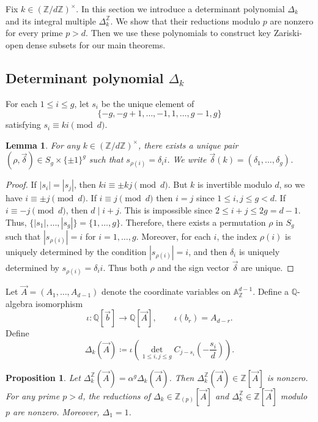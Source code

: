 \documentclass{amsart}
\theoremstyle{plain}
\newtheorem{prop}[theorem]{Proposition}
\newtheorem{lemma}[theorem]{Lemma}
\theoremstyle{remark}
\newcommand{\1}{\mathbf{1}}
\newcommand{\A}{\mathbb{A}}
\newcommand{\Q}{\mathbb{Q}}
\newcommand{\Z}{\mathbb{Z}}
\newcommand{\vA}{{\vec{A}}}
\newcommand{\vb}{{\vec{b}}}
\newcommand{\bdelta}{{\vec\delta}}
\begin{document}
Fix $k\in(\Z/d\Z)^\times$.
In this section we introduce a determinant polynomial $\Delta_k$
and its integral multiple $\Delta_k^\Z$. We show that
their reductions
modulo $p$ are nonzero
for every prime $p>d$. Then we use these polynomials to
construct key Zariski-open dense subsets for our main theorems.

\subsection{\texorpdfstring{Determinant polynomial $\Delta_k$}{Determinant polynomial}}
\label{S:3.1}

For each $1\le i\le g$,
let $s_i$ be the unique element of
\[
\{-g,-g+1,\ldots,-1,1,\ldots,g-1,g\}
\]
satisfying $s_i\equiv ki\pmod d$.

\begin{lemma}\label{L:delta}
For any $k\in(\Z/d\Z)^\times$,
there exists a unique pair $(\rho,\bdelta)\in S_g\times \{\pm 1\}^g$
such that
$s_{\rho(i)}=\delta_i i$.
We write $\bdelta(k)=(\delta_1,\ldots,\delta_g)$.
\end{lemma}

\begin{proof}
If $|s_i|=|s_j|$, then $ki\equiv \pm kj\pmod d$.
But $k$ is invertible modulo $d$,
so we have $i\equiv \pm j\pmod d$.
If $i\equiv j\pmod d$ then $i=j$ since $1\le i,j\le g<d$.
If $i\equiv -j\pmod d$, then $d\mid i+j$.
This is impossible since $2\le i+j\le 2g=d-1$.
Thus,
$\{|s_1|,\ldots,|s_g|\}=\{1,\ldots,g\}$.
Therefore, there exists a permutation $\rho$ in $S_g$ such that
$|s_{\rho(i)}|=i$ for $i=1,\ldots,g$.
Moreover, for each $i$, the index $\rho(i)$ is
uniquely determined by the condition
$|s_{\rho(i)}|=i$, and
then $\delta_i$ is uniquely determined by
$s_{\rho(i)}=\delta_i i$.
Thus both $\rho$ and the sign vector $\bdelta$
are unique.
\end{proof}


Let $\vA=(A_1,\ldots,A_{d-1})$ denote the coordinate variables on $\A_\Z^{d-1}$.
Define a $\Q$-algebra isomorphism
\begin{equation}\label{E:iota}
\iota: \Q[\vb]\longrightarrow \Q[\vA], \qquad \iota(b_r)=A_{d-r}.
\end{equation}
Define
\begin{equation*}
\boxed{\Delta_k(\vA)\coloneqq
\iota \left(\det_{1\le i,j\le g} C_{j-s_i}\left(-\frac{s_i}{d}\right)\right).}
\end{equation*}

\begin{prop}\label{P:Delta}
Let $\Delta_k^\Z(\vA)=\alpha^g\Delta_k(\vA)$.
Then $\Delta_k^\Z(\vA)\in\Z[\vA]$ is nonzero.
For any prime $p>d$,
the reductions of $\Delta_k\in\Z_{(p)}[\vA]$ and $\Delta_k^\Z\in\Z[\vA]$
modulo $p$ are nonzero.
Moreover, $\Delta_1=1$.
\end{prop}
\end{document}
